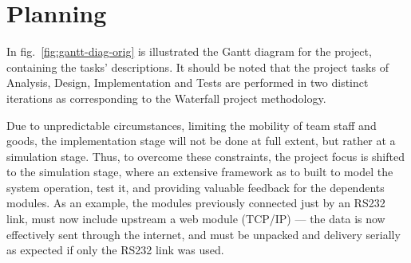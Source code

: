 \section{Planning}%
\label{sec:orga82318d}
In fig.~\ref{fig:gantt-diag-orig} is illustrated the Gantt diagram for the project, containing the tasks' descriptions. It should be noted
that the project tasks of Analysis, Design, Implementation and Tests are
performed in two distinct iterations as corresponding to the Waterfall project
methodology.

Due to unpredictable circumstances, limiting the mobility of team
staff and goods, the implementation stage will not be done at full extent, but
rather at a simulation stage. Thus, to overcome these constraints, the project
focus is shifted to the simulation stage, where an extensive framework as to
built to model the system operation, test it, and providing valuable feedback
for the dependents modules. As an example, the modules previously connected just
by an RS232 link, must now include upstream a web module (TCP/IP) --- the data
is now effectively sent through the internet, and must be unpacked and delivery
serially as expected if only the RS232 link was used.

